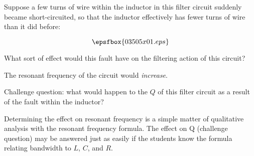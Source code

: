 

Suppose a few turns of wire within the inductor in this filter circuit suddenly became short-circuited, so that the inductor effectively has fewer turns of wire than it did before:

$$\epsfbox{03505x01.eps}$$

What sort of effect would this fault have on the filtering action of this circuit?







The resonant frequency of the circuit would {\it increase}.

\vskip 10pt

Challenge question: what would happen to the $Q$ of this filter circuit as a result of the fault within the inductor?







Determining the effect on resonant frequency is a simple matter of qualitative analysis with the resonant frequency formula.  The effect on Q (challenge question) may be answered just as easily if the students know the formula relating bandwidth to $L$, $C$, and $R$.




